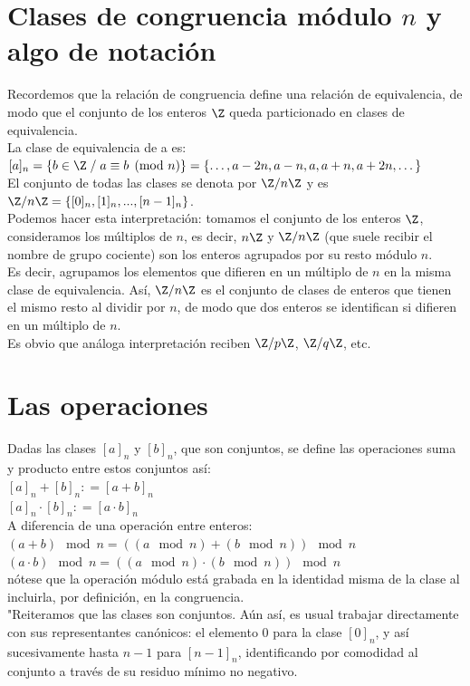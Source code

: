 \section{Clases de congruencia módulo $n$ y algo de notación}
Recordemos que la relación de congruencia define una relación de equivalencia, de modo que el conjunto de los enteros $\Z$ queda particionado en clases de equivalencia. \\
La clase de equivalencia de a es: \\
$[a]_n = \{ b \in \Z \; / \; a \equiv b \pmod n\} = \{\dots, a - 2n, a - n, a, a + n, a + 2n, \dots \}$ \\
El conjunto de todas las clases se denota por $\Z/n\Z$ y es $\Z/n\Z = \{[0]_n, [1]_n, ..., [n -1]_n \}$. \\
 Podemos hacer esta interpretación: tomamos el conjunto de los enteros $\Z$, consideramos los múltiplos de $n$, es decir, $n\Z$ y $\Z/n\Z$ (que suele recibir el nombre de grupo cociente) son los enteros agrupados por su resto módulo $n$. \\
 Es decir, agrupamos los elementos que difieren en un múltiplo de $n$ en la misma clase de equivalencia. Así, $\Z/n\Z$ es el conjunto de clases de enteros que tienen el mismo resto al dividir por $n$, de modo que dos enteros se identifican si difieren en un múltiplo de $n$. \\
Es obvio que análoga interpretación reciben $\Z/p\Z$, $\Z/q\Z$, etc. 

\section{Las operaciones}
Dadas las clases $[a]_n$ y $[b]_n$, que son conjuntos, se define las operaciones suma y producto entre estos conjuntos así: \\
$[a]_n + [b]_n : = [a + b]_n$ \\
$[a]_n \cdot [b]_n : = [a \cdot b]_n$ \\
A diferencia de una operación entre enteros: \\
$(a+b) \mod n = ( (a \mod n) + (b \mod n) ) \mod n$ \\
$(a \cdot b) \mod n = ( (a \mod n) \cdot (b \mod n) ) \mod n$ \\
nótese que la operación módulo está grabada en la identidad misma de la clase al incluirla, por definición, en la congruencia.  \\
"Reiteramos que las clases son conjuntos. Aún así, es usual trabajar directamente con sus representantes canónicos: el elemento $0$ para la clase $[0]_n$, y así sucesivamente hasta $n-1$ para $[n-1]_n$, identificando por comodidad al conjunto a través de su residuo mínimo no negativo.

